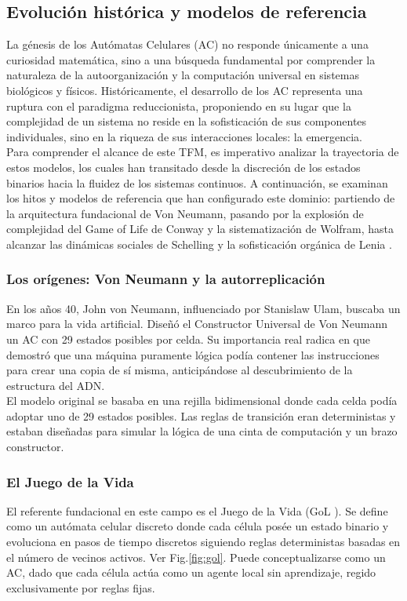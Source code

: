 \documentclass[runningheads]{llncs}
\begin{document}
\subsection{Evolución histórica y modelos de referencia}
La génesis de los Autómatas Celulares (AC) no responde únicamente a una curiosidad matemática, sino a una búsqueda fundamental por comprender la naturaleza de la autoorganización y la computación universal en sistemas biológicos y físicos. Históricamente, el desarrollo de los AC representa una ruptura con el paradigma reduccionista, proponiendo en su lugar que la complejidad de un sistema no reside en la sofisticación de sus componentes individuales, sino en la riqueza de sus interacciones locales: la emergencia.\\

Para comprender el alcance de este TFM, es imperativo analizar la trayectoria de estos modelos, los cuales han transitado desde la discreción de los estados binarios hacia la fluidez de los sistemas continuos. A continuación, se examinan los hitos y modelos de referencia que han configurado este dominio: partiendo de la arquitectura fundacional de Von Neumann, pasando por la explosión de complejidad del Game of Life de Conway y la sistematización de Wolfram, hasta alcanzar las dinámicas sociales de Schelling y la sofisticación orgánica de Lenia \cite{ref_lenia}.

\subsubsection{Los orígenes: Von Neumann y la autorreplicación}
En los años 40, John von Neumann, influenciado por Stanislaw Ulam, buscaba un marco para la vida artificial. Diseñó el Constructor Universal de Von Neumann \cite{ref_mcmullin_vonneumann} un AC con 29 estados posibles por celda. Su importancia real radica en que demostró que una máquina puramente lógica podía contener las instrucciones para crear una copia de sí misma, anticipándose al descubrimiento de la estructura del ADN.\\

El modelo original se basaba en una rejilla bidimensional donde cada celda podía adoptar uno de 29 estados posibles. Las reglas de transición eran deterministas y estaban diseñadas para simular la lógica de una cinta de computación y un brazo constructor.

\subsubsection{El Juego de la Vida}
El referente fundacional en este campo es el Juego de la Vida (GoL \cite{ref_gol}). Se define como un autómata celular discreto donde cada célula posée un estado binario y evoluciona en pasos de tiempo discretos siguiendo reglas deterministas basadas en el número de vecinos activos. Ver Fig.\ref{fig:gol}. Puede conceptualizarse como un AC, dado que cada célula actúa como un agente local sin aprendizaje, regido exclusivamente por reglas fijas.
\end{document}
